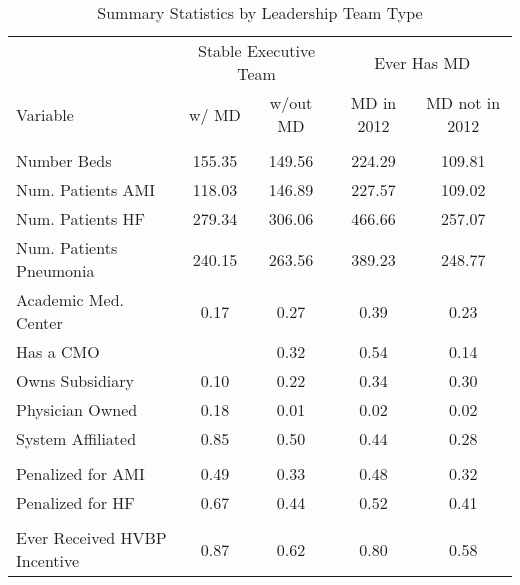 \begin{table}[h]
\centering
\caption{\label{tab:sumstats_samples_stable}Summary Statistics by Leadership Team Type}
\centering
\begin{tabular}[t]{lcccc}
\toprule
\multicolumn{1}{c}{ } & \multicolumn{2}{c}{Stable Executive Team} & \multicolumn{2}{c}{Ever Has MD} \\
\cmidrule(l{3pt}r{3pt}){2-3} \cmidrule(l{3pt}r{3pt}){4-5}
Variable & w/ MD & w/out MD & MD in 2012 & MD not in 2012\\
\midrule
\addlinespace[0.3em]
\multicolumn{5}{l}{\textbf{Hospital Characteristics}}\\
\hspace{1em}Number Beds & 155.35 & 149.56 & 224.29 & 109.81\\
\hspace{1em}Num. Patients AMI & 118.03 & 146.89 & 227.57 & 109.02\\
\hspace{1em}Num. Patients HF & 279.34 & 306.06 & 466.66 & 257.07\\
\hspace{1em}Num. Patients Pneumonia & 240.15 & 263.56 & 389.23 & 248.77\\
\hspace{1em}Academic Med. Center & 0.17 & 0.27 & 0.39 & 0.23\\
\hspace{1em}Has a CMO &  & 0.32 & 0.54 & 0.14\\
\hspace{1em}Owns Subsidiary & 0.10 & 0.22 & 0.34 & 0.30\\
\hspace{1em}Physician Owned & 0.18 & 0.01 & 0.02 & 0.02\\
\hspace{1em}System Affiliated & 0.85 & 0.50 & 0.44 & 0.28\\
\addlinespace[0.3em]
\multicolumn{5}{l}{\textbf{Penalty/Payment Variables}}\\
\hspace{1em}Penalized for AMI & 0.49 & 0.33 & 0.48 & 0.32\\
\hspace{1em}Penalized for HF & 0.67 & 0.44 & 0.52 & 0.41\\
\hspace{1em} &  &  &  & \\
\hspace{1em}Ever Received HVBP Incentive & 0.87 & 0.62 & 0.80 & 0.58\\

\end{tabular}
\end{table}
